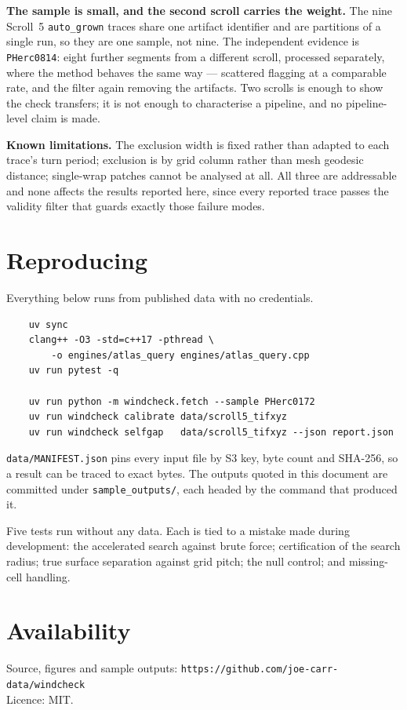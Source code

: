 \documentclass[11pt,a4paper]{article}
\begin{document}
\textbf{The sample is small, and the second scroll carries the weight.} The nine
Scroll~5 \texttt{auto\_grown} traces share one artifact identifier and are
partitions of a single run, so they are one sample, not nine. The independent
evidence is \texttt{PHerc0814}: eight further segments from a different scroll,
processed separately, where the method behaves the same way --- scattered
flagging at a comparable rate, and the filter again removing the artifacts. Two
scrolls is enough to show the check transfers; it is not enough to characterise
a pipeline, and no pipeline-level claim is made.

\textbf{Known limitations.} The exclusion width is fixed rather than adapted to
each trace's turn period; exclusion is by grid column rather than mesh geodesic
distance; single-wrap patches cannot be analysed at all. All three are
addressable and none affects the results reported here, since every reported
trace passes the validity filter that guards exactly those failure modes.

\section{Reproducing}

Everything below runs from published data with no credentials.

{\small
\begin{verbatim}
    uv sync
    clang++ -O3 -std=c++17 -pthread \
        -o engines/atlas_query engines/atlas_query.cpp
    uv run pytest -q

    uv run python -m windcheck.fetch --sample PHerc0172
    uv run windcheck calibrate data/scroll5_tifxyz
    uv run windcheck selfgap   data/scroll5_tifxyz --json report.json
\end{verbatim}
}

\texttt{data/MANIFEST.json} pins every input file by S3 key, byte count and
SHA-256, so a result can be traced to exact bytes. The outputs quoted in this
document are committed under \texttt{sample\_outputs/}, each headed by the
command that produced it.

Five tests run without any data. Each is tied to a mistake made during
development: the accelerated search against brute force; certification of the
search radius; true surface separation against grid pitch; the null control; and
missing-cell handling.

\section*{Availability}

Source, figures and sample outputs: \texttt{https://github.com/joe-carr-data/windcheck}\\
Licence: MIT.
\end{document}
